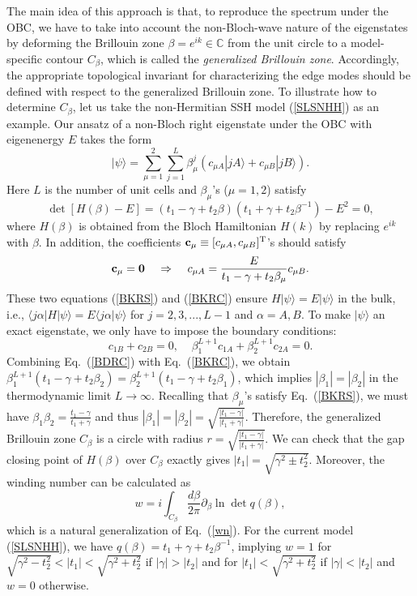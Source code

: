 \documentclass{tADP2e}
\theoremstyle{plain}
\theoremstyle{plain}
\theoremstyle{definition}
\begin{document}
The main idea of this approach is that, to reproduce the spectrum under the OBC, we have to take into account the non-Bloch-wave nature of the eigenstates by deforming the Brillouin zone $\beta=e^{ik}\in\mathbb{C}$ from the unit circle to a model-specific contour $C_\beta$, which is called the \emph{generalized Brillouin zone}. Accordingly, the appropriate topological invariant for characterizing the edge modes should be defined with respect to the generalized Brillouin zone. To illustrate how to determine $C_\beta$, let us take the non-Hermitian SSH model (\ref{SLSNHH}) as an example. Our ansatz of a non-Bloch right eigenstate under the OBC with eigenenergy $E$ takes the form \cite{YS18a}
\begin{equation}
|\psi\rangle=\sum^2_{\mu=1}\sum^L_{j=1}\beta_\mu^j(c_{\mu A}|jA\rangle+c_{\mu B}|jB\rangle).
\end{equation}
Here $L$ is the number of unit cells and $\beta_\mu$'s ($\mu=1,2$) satisfy
\begin{equation}
\det[H(\beta)-E]=(t_1-\gamma+t_2\beta)(t_1+\gamma+t_2\beta^{-1})-E^2=0,
\label{BKRS}
\end{equation}
where $H(\beta)$ is obtained from the Bloch Hamiltonian $H(k)$ by replacing $e^{ik}$ with $\beta$. In addition, the coefficients $\bold{c}_\mu\equiv [c_{\mu A},c_{\mu B}]^{\rm T}$'s should satisfy 
\begin{equation}
[H(\beta)-E]\bold{c}_\mu=\bold{0}\;\;\;\;\Rightarrow\;\;\;\; c_{\mu A}=\frac{E}{t_1-\gamma+t_2\beta_\mu}c_{\mu B}.
\label{BKRC}
\end{equation}
These two equations (\ref{BKRS}) and (\ref{BKRC}) ensure $H|\psi\rangle=E|\psi\rangle$ in the bulk, i.e., $\langle j\alpha|H|\psi\rangle=E\langle j\alpha|\psi\rangle$ for $j=2,3,...,L-1$ and $\alpha=A,B$. To make $|\psi\rangle$ an exact eigenstate, we only have to impose the boundary conditions:
\begin{equation}
c_{1B}+c_{2B}=0,\;\;\;\;\beta_1^{L+1}c_{1A}+\beta_2^{L+1}c_{2A}=0.
\label{BDRC}
\end{equation}
Combining Eq.~(\ref{BDRC}) with Eq.~(\ref{BKRC}), we obtain $\beta_1^{L+1}(t_1-\gamma+t_2\beta_2)=\beta_2^{L+1}(t_1-\gamma+t_2\beta_1)$, 
which implies $|\beta_1|=|\beta_2|$ in the thermodynamic limit $L\to\infty$. Recalling that $\beta_\mu$'s satisfy Eq.~(\ref{BKRS}), we must have $\beta_1\beta_2=\frac{t_1-\gamma}{t_1+\gamma}$ and thus $|\beta_1|=|\beta_2|=\sqrt{\frac{|t_1-\gamma|}{|t_1+\gamma|}}$. Therefore, the generalized Brillouin zone $C_\beta$ is a circle with radius $r=\sqrt{\frac{|t_1-\gamma|}{|t_1+\gamma|}}$. We can check that the gap closing point of $H(\beta)$ over $C_\beta$ exactly gives $|t_1|=\sqrt{\gamma^2\pm t_2^2}$. Moreover, the winding number can be calculated as
\begin{equation}
w=i\int_{C_\beta}\frac{d\beta}{2\pi}\partial_\beta\ln\det q(\beta),
\label{GBZwn}
\end{equation}
which is a natural generalization of Eq.~(\ref{wn}). For the current model (\ref{SLSNHH}), we have $q(\beta)=t_1+\gamma+t_2\beta^{-1}$, implying $w=1$ for $\sqrt{\gamma^2-t_2^2}<|t_1|<\sqrt{\gamma^2+t_2^2}$ if $|\gamma|>|t_2|$ and for $|t_1|<\sqrt{\gamma^2+t_2^2}$ if $|\gamma|<|t_2|$ and $w=0$ otherwise.
\end{document}
